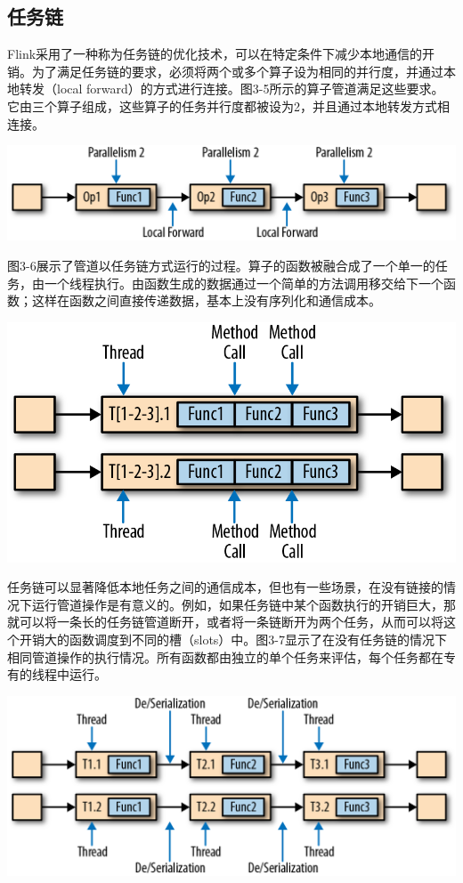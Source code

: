 \documentclass[cn,11pt,chinese]{elegantbook}
\begin{document}
\hypertarget{ux4efbux52a1ux94fe}{%
\subsection{任务链}\label{ux4efbux52a1ux94fe}}

Flink采用了一种称为任务链的优化技术，可以在特定条件下减少本地通信的开销。为了满足任务链的要求，必须将两个或多个算子设为相同的并行度，并通过本地转发（local
forward）的方式进行连接。图3-5所示的算子管道满足这些要求。它由三个算子组成，这些算子的任务并行度都被设为2，并且通过本地转发方式相连接。

\includegraphics{images/spaf_0305.png}

图3-6展示了管道以任务链方式运行的过程。算子的函数被融合成了一个单一的任务，由一个线程执行。由函数生成的数据通过一个简单的方法调用移交给下一个函数；这样在函数之间直接传递数据，基本上没有序列化和通信成本。

\includegraphics{images/spaf_0306.png}

任务链可以显著降低本地任务之间的通信成本，但也有一些场景，在没有链接的情况下运行管道操作是有意义的。例如，如果任务链中某个函数执行的开销巨大，那就可以将一条长的任务链管道断开，或者将一条链断开为两个任务，从而可以将这个开销大的函数调度到不同的槽（slots）中。图3-7显示了在没有任务链的情况下相同管道操作的执行情况。所有函数都由独立的单个任务来评估，每个任务都在专有的线程中运行。

\includegraphics{images/spaf_0307.png}
\end{document}

